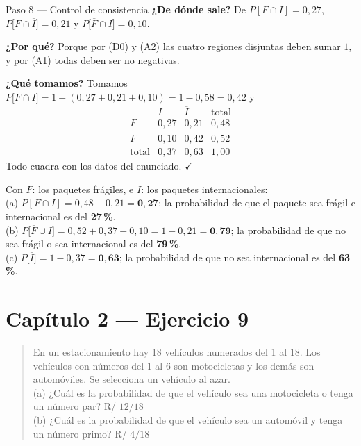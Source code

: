 \documentclass[11pt]{article}
\begin{document}
\begin{sol}
\begin{paso}{Paso 8 --- Control de consistencia}
\textbf{¿De dónde sale?} De $P[F\cap I]=0{,}27$, $P\big[F\cap\overline{I}\big]=0{,}21$ y
$P\big[\overline{F}\cap I\big]=0{,}10$.

\textbf{¿Por qué?} Porque por (D0) y (A2) las cuatro regiones disjuntas deben sumar $1$, y por
(A1) todas deben ser no negativas.

\textbf{¿Qué tomamos?} Tomamos
$P\big[\overline{F}\cap\overline{I}\big]=1-(0{,}27+0{,}21+0{,}10)=1-0{,}58=0{,}42$ y
\[
\begin{array}{c|cc|c}
 & I & \overline{I} & \text{total}\\\hline
F & 0{,}27 & 0{,}21 & 0{,}48\\
\overline{F} & 0{,}10 & 0{,}42 & 0{,}52\\\hline
\text{total} & 0{,}37 & 0{,}63 & 1{,}00
\end{array}
\]
Todo cuadra con los datos del enunciado. $\checkmark$
\end{paso}

\end{sol}

\begin{resp}
Con $F$: los paquetes frágiles, e $I$: los paquetes internacionales:\\[4pt]
(a) $P[F\cap I]=0{,}48-0{,}21=\mathbf{0{,}27}$; la probabilidad de que el paquete sea frágil e
internacional es del \textbf{27\,\%}.\\[4pt]
(b) $P\big[\overline{F}\cup I\big]=0{,}52+0{,}37-0{,}10=1-0{,}21=\mathbf{0{,}79}$; la
probabilidad de que no sea frágil o sea internacional es del \textbf{79\,\%}.\\[4pt]
(c) $P\big[\overline{I}\big]=1-0{,}37=\mathbf{0{,}63}$; la probabilidad de que no sea
internacional es del \textbf{63\,\%}.
\end{resp}

\section*{Capítulo 2 --- Ejercicio 9}

\begin{quote}
En un estacionamiento hay 18 vehículos numerados del 1 al 18. Los vehículos con números del 1 al
6 son motocicletas y los demás son automóviles. Se selecciona un vehículo al azar.\\
(a) ¿Cuál es la probabilidad de que el vehículo sea una motocicleta o tenga un número par? \hfill R/ $12/18$\\
(b) ¿Cuál es la probabilidad de que el vehículo sea un automóvil y tenga un número primo? \hfill R/ $4/18$
\end{quote}
\end{document}
